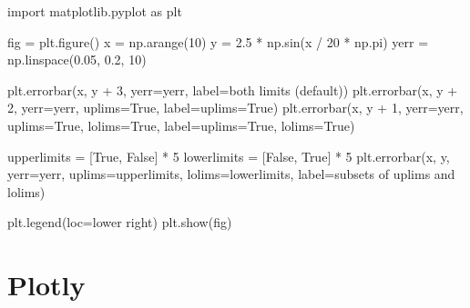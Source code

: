 \documentclass[
  letterpaper,
  DIV=11,
  numbers=noendperiod]{scrreprt}
\newenvironment{Shaded}{\begin{snugshade}}{\end{snugshade}}
\newcommand{\DecValTok}[1]{\textcolor[rgb]{0.68,0.00,0.00}{#1}}
\newcommand{\FloatTok}[1]{\textcolor[rgb]{0.68,0.00,0.00}{#1}}
\newcommand{\ImportTok}[1]{\textcolor[rgb]{0.00,0.46,0.62}{#1}}
\newcommand{\NormalTok}[1]{\textcolor[rgb]{0.00,0.23,0.31}{#1}}
\newcommand{\OperatorTok}[1]{\textcolor[rgb]{0.37,0.37,0.37}{#1}}
\newcommand{\StringTok}[1]{\textcolor[rgb]{0.13,0.47,0.30}{#1}}
\newcommand{\VariableTok}[1]{\textcolor[rgb]{0.07,0.07,0.07}{#1}}
\begin{document}
\begin{Shaded}
\begin{Highlighting}[]
\ImportTok{import}\NormalTok{ matplotlib.pyplot }\ImportTok{as}\NormalTok{ plt}

\NormalTok{fig }\OperatorTok{=}\NormalTok{ plt.figure()}
\NormalTok{x }\OperatorTok{=}\NormalTok{ np.arange(}\DecValTok{10}\NormalTok{)}
\NormalTok{y }\OperatorTok{=} \FloatTok{2.5} \OperatorTok{*}\NormalTok{ np.sin(x }\OperatorTok{/} \DecValTok{20} \OperatorTok{*}\NormalTok{ np.pi)}
\NormalTok{yerr }\OperatorTok{=}\NormalTok{ np.linspace(}\FloatTok{0.05}\NormalTok{, }\FloatTok{0.2}\NormalTok{, }\DecValTok{10}\NormalTok{)}

\NormalTok{plt.errorbar(x, y }\OperatorTok{+} \DecValTok{3}\NormalTok{, yerr}\OperatorTok{=}\NormalTok{yerr, label}\OperatorTok{=}\StringTok{\textquotesingle{}both limits (default)\textquotesingle{}}\NormalTok{)}
\NormalTok{plt.errorbar(x, y }\OperatorTok{+} \DecValTok{2}\NormalTok{, yerr}\OperatorTok{=}\NormalTok{yerr, uplims}\OperatorTok{=}\VariableTok{True}\NormalTok{, label}\OperatorTok{=}\StringTok{\textquotesingle{}uplims=True\textquotesingle{}}\NormalTok{)}
\NormalTok{plt.errorbar(x, y }\OperatorTok{+} \DecValTok{1}\NormalTok{, yerr}\OperatorTok{=}\NormalTok{yerr, uplims}\OperatorTok{=}\VariableTok{True}\NormalTok{, lolims}\OperatorTok{=}\VariableTok{True}\NormalTok{,}
\NormalTok{             label}\OperatorTok{=}\StringTok{\textquotesingle{}uplims=True, lolims=True\textquotesingle{}}\NormalTok{)}

\NormalTok{upperlimits }\OperatorTok{=}\NormalTok{ [}\VariableTok{True}\NormalTok{, }\VariableTok{False}\NormalTok{] }\OperatorTok{*} \DecValTok{5}
\NormalTok{lowerlimits }\OperatorTok{=}\NormalTok{ [}\VariableTok{False}\NormalTok{, }\VariableTok{True}\NormalTok{] }\OperatorTok{*} \DecValTok{5}
\NormalTok{plt.errorbar(x, y, yerr}\OperatorTok{=}\NormalTok{yerr, uplims}\OperatorTok{=}\NormalTok{upperlimits, lolims}\OperatorTok{=}\NormalTok{lowerlimits,}
\NormalTok{             label}\OperatorTok{=}\StringTok{\textquotesingle{}subsets of uplims and lolims\textquotesingle{}}\NormalTok{)}

\NormalTok{plt.legend(loc}\OperatorTok{=}\StringTok{\textquotesingle{}lower right\textquotesingle{}}\NormalTok{)}
\NormalTok{plt.show(fig)}
\end{Highlighting}
\end{Shaded}

\hypertarget{plotly}{%
\section{Plotly}\label{plotly}}
\end{document}
